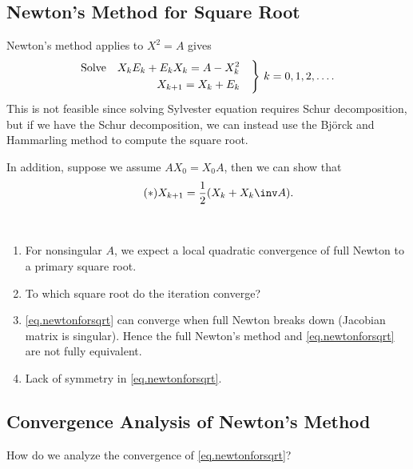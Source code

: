 \documentclass{article}
\begin{document}
\subsection{Newton's Method for Square Root}

Newton's method applies to $X^2=A$ gives 
\begin{equation}\notag
    \begin{aligned}
        \text{Solve}\quad X_kE_k +E_kX_k = A-X_k^2 & \quad  \\
        X_{k+1} = X_k + E_k & \quad 
    \end{aligned} \Bigg\} \ k = 0,1,2,\dots.
\end{equation}
This is not feasible since solving Sylvester equation requires Schur
decomposition, but if we have the Schur decomposition, we can instead
use the Bj\"orck and Hammarling method to compute the square root.

In addition, suppose we assume $AX_0 = X_0A$, then we can show that 
\begin{equation}\tag{$\ast$}\label{eq.newtonforsqrt}
    X_{k+1} = \frac{1}{2}(X_k + X_k\inv A).
\end{equation}

\begin{remark}
    \ 
    \begin{enumerate}
        \item For nonsingular $A$, we expect a local quadratic
        convergence of full Newton to a primary square root.
        \item To which square root do the iteration converge?
        \item \eqref{eq.newtonforsqrt} can converge when full Newton
        breaks down (Jacobian matrix is singular). Hence the full
        Newton's method and \eqref{eq.newtonforsqrt} are not fully
        equivalent.
        \item Lack of symmetry in \eqref{eq.newtonforsqrt}.
    \end{enumerate}
\end{remark}

\subsection{Convergence Analysis of Newton's Method}

How do we analyze the convergence of \eqref{eq.newtonforsqrt}? 
\end{document}

